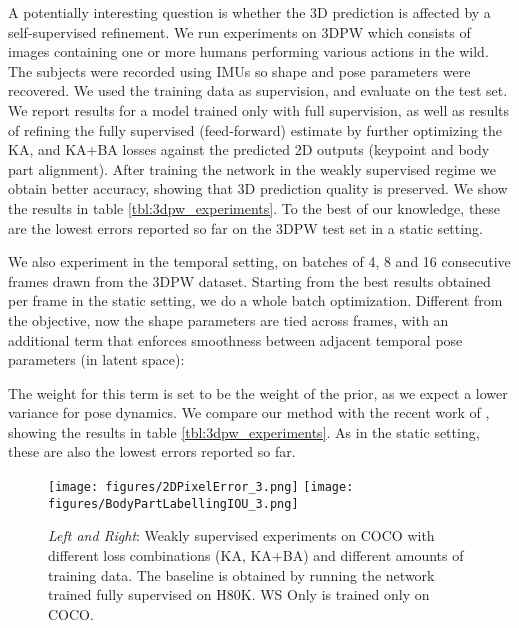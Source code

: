 \documentclass[runningheads]{llncs}
\begin{document}
A potentially interesting question is whether the 3D prediction is affected by a self-supervised refinement. We run experiments on 3DPW \cite{vonMarcard2018} which consists of  images containing one or more humans performing various actions in the wild. The subjects were recorded using IMUs so shape and pose parameters were recovered. We used the training data as supervision, and evaluate on the test set. We report results for a model trained only with full supervision, as well as results of refining the fully supervised (feed-forward) estimate by further optimizing the KA, and KA+BA losses against the predicted 2D outputs (keypoint and body part alignment). After training the network in the weakly supervised regime we obtain better accuracy, showing that 3D prediction quality is preserved. We show the results in table \ref{tbl:3dpw_experiments}. To the best of our knowledge, these are the lowest errors reported so far on the 3DPW test set in a static setting.

 We also experiment in the temporal setting, on batches of 4, 8 and 16 consecutive frames drawn from the 3DPW dataset. Starting from the best results obtained per frame in the static setting, we do a whole batch optimization. Different from the  objective, now the shape parameters are tied across frames, with an additional term that enforces smoothness between adjacent temporal pose parameters (in latent space):


The weight for this term is set to be  the weight of the prior, as we expect a lower variance for pose dynamics. We compare our method with the recent work of \cite{kocabas2019vibe}, showing the results in table \ref{tbl:3dpw_experiments}. As in the static setting, these are also the lowest errors reported so far.


\begin{figure}[!htbp]
\begin{center}
    \texttt{[image: figures/2DPixelError\_3.png]}
    \texttt{[image: figures/BodyPartLabellingIOU\_3.png]}
\end{center}

\caption{\small \textit{Left and Right}: Weakly supervised experiments on COCO with different loss combinations (KA, KA+BA) and different amounts of training data. The baseline is obtained by running the network trained fully supervised on H80K. WS Only is trained only on COCO.}
\label{fig:ka-kb-weight_sensitivity-figure}
\end{figure}
\end{document}
